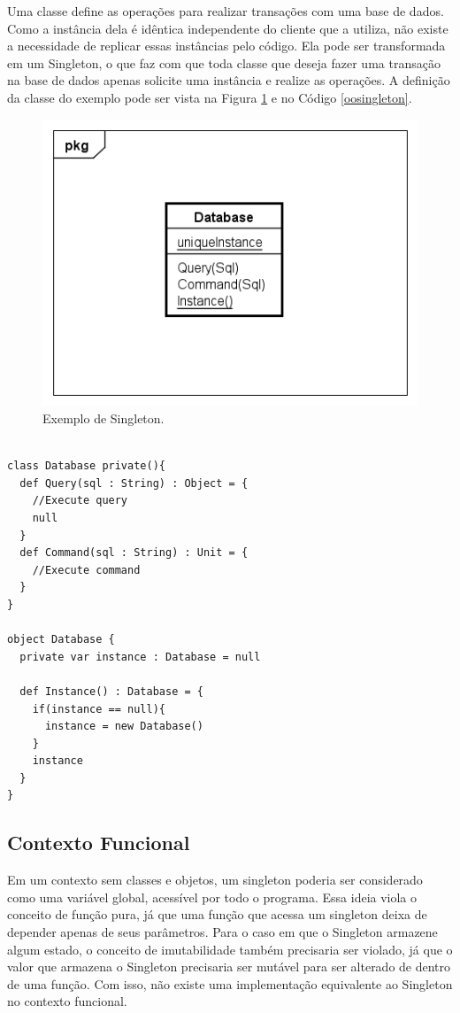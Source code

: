 Uma classe define as operações para realizar transações com 
uma base de dados. Como a instância dela é idêntica independente 
do cliente que a utiliza, não existe a necessidade de replicar 
essas instâncias pelo código. Ela pode ser transformada em 
um Singleton, o que faz com que toda classe que deseja fazer 
uma transação na base de dados apenas solicite uma instância 
e realize as operações. A definição da classe do exemplo 
pode ser vista na Figura \ref{singleton_exemplo} e no 
Código \ref{oosingleton}.

\begin{figure}[htb]
	\caption{\label{singleton_exemplo}Exemplo de Singleton.}
	\begin{center}
	    \includegraphics[scale=0.6]{5_padroes-contexto-funcional/5.1_criacionais/5.1.5_singleton/singleton_exemplo.png}
	\end{center}
\end{figure}

\begin{lstlisting}[caption={Singleton Orientação a Objetos.},label=oosingleton]

class Database private(){
  def Query(sql : String) : Object = {
    //Execute query
    null
  }
  def Command(sql : String) : Unit = {
    //Execute command
  }
}

object Database {
  private var instance : Database = null

  def Instance() : Database = {
    if(instance == null){
      instance = new Database()
    }
    instance
  }
}

\end{lstlisting}

\subsection*{Contexto Funcional}

Em um contexto sem classes e objetos, 
um singleton poderia ser considerado como 
uma variável global, acessível por 
todo o programa. Essa ideia viola o conceito 
de função pura, já que uma função que acessa 
um singleton deixa de depender apenas de seus 
parâmetros. Para o caso em que o Singleton 
armazene algum estado, o conceito de imutabilidade 
também precisaria ser violado, já que o 
valor que armazena o Singleton precisaria ser 
mutável para ser alterado de dentro de uma 
função. Com isso, não existe uma implementação 
equivalente ao Singleton no contexto funcional.